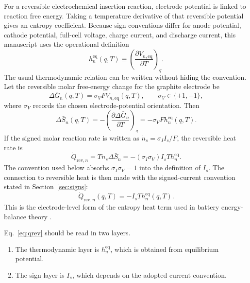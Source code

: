 \documentclass[11pt,a4paper]{article}
\newcommand{\eqs}{\mathrm{eq}}
\newcommand{\rev}{\mathrm{rev}}
\begin{document}
For a reversible electrochemical insertion reaction, electrode potential is linked to reaction free energy.
Taking a temperature derivative of that reversible potential gives an entropy coefficient. Because sign
conventions differ for anode potential, cathode potential, full-cell voltage, charge current, and discharge
current, this manuscript uses the operational definition
\begin{equation}
h_n^{\eqs}(q,T)
\equiv
\left(\frac{\partial V_{n,\eqs}}{\partial T}\right)_q.
\label{eq:h_operational}
\end{equation}
The usual thermodynamic relation can be written without hiding the convention. Let the reversible molar
free-energy change for the graphite electrode be
\begin{equation}
\Delta \bar G_n(q,T)=\sigma_VF V_{n,\eqs}(q,T),
\qquad \sigma_V\in\{+1,-1\},
\label{eq:Gbar_sign}
\end{equation}
where \(\sigma_V\) records the chosen electrode-potential orientation. Then
\begin{equation}
\Delta \bar S_n(q,T)
=
-\left(\frac{\partial \Delta \bar G_n}{\partial T}\right)_q
=
-\sigma_VF h_n^{\eqs}(q,T).
\label{eq:Sbar_sign}
\end{equation}
If the signed molar reaction rate is written as \(\dot n_s=\sigma_I I_s/F\), the reversible heat rate is
\begin{equation}
\dot Q_{\rev,n}
=
T\dot n_s\Delta \bar S_n
=
-(\sigma_I\sigma_V)I_sT h_n^{\eqs}.
\label{eq:qrev_sign_general}
\end{equation}
The convention used below absorbs \(\sigma_I\sigma_V=1\) into the definition of \(I_s\).
The connection to reversible heat is then made with the signed-current convention stated in
Section~\ref{sec:signs}:
\begin{equation}
\dot Q_{\rev,n}(q,T)
=
-I_sT h_n^{\eqs}(q,T).
\label{eq:qrev}
\end{equation}
This is the electrode-level form of the entropy heat term used in battery energy-balance theory
\cite{bernardi1985,thomas2003,newman2004}.

Eq.~\eqref{eq:qrev} should be read in two layers.

\begin{enumerate}[leftmargin=2em]
\item The thermodynamic layer is \(h_n^{\eqs}\), which is obtained from equilibrium potential.
\item The sign layer is \(I_s\), which depends on the adopted current convention.
\end{enumerate}
\end{document}
